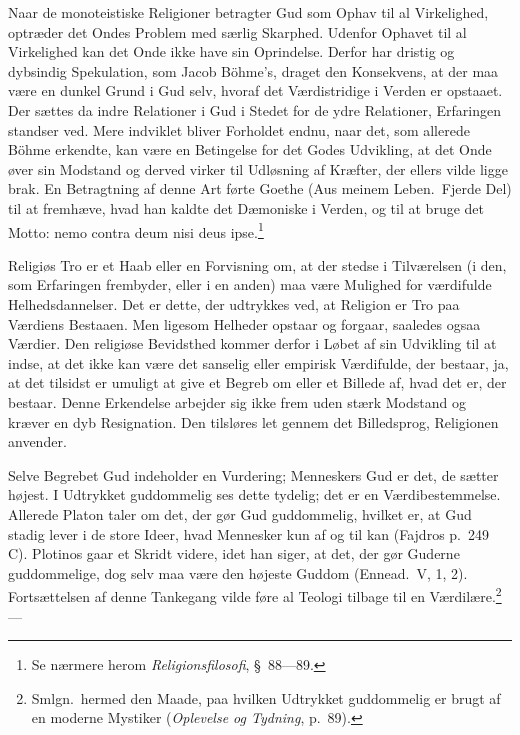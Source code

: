 \documentclass[12pt]{article}
\newcommand{\opage}[1]{\marginnote{\footnotesize\textit{[#1]}}}
\begin{document}
Naar de monoteistiske Religioner betragter Gud som Ophav til al
Virkelighed, optræder det Ondes Problem med særlig Skarphed. Udenfor
Ophavet til al Virkelighed kan det Onde ikke have sin Oprindelse.
Derfor har dristig og dybsindig Spekulation, som Jacob Böhme's, draget
den Konsekvens, at der maa være en dunkel Grund i Gud selv, hvoraf det
Værdistridige i Verden er opstaaet. Der sættes da indre Relationer i
Gud i Stedet for de ydre Relationer, Erfaringen standser ved. Mere
indviklet bliver Forholdet endnu, naar det, som allerede Böhme
erkendte, kan være en Betingelse for det Godes Udvikling, at det Onde
øver sin Modstand og derved virker til Udløsning af Kræfter, der
ellers vilde ligge brak. En Betragtning af denne Art
\opage{97} \setcounter{footnote}{0}
førte Goethe (Aus meinem Leben.\ Fjerde Del) til at fremhæve, hvad han
kaldte det Dæmoniske i Verden, og til at bruge det Motto: nemo contra
deum nisi deus ipse.\footnote{Se nærmere herom
\textit{Religionsfilosofi}, §~88---89.}

Religiøs Tro er et Haab eller en Forvisning om, at der stedse i
Tilværelsen (i den, som Erfaringen frembyder, eller i en anden) maa
være Mulighed for værdifulde Helhedsdannelser. Det er dette, der
udtrykkes ved, at Religion er Tro paa Værdiens Bestaaen. Men ligesom
Helheder opstaar og forgaar, saaledes ogsaa Værdier. Den religiøse
Bevidsthed kommer derfor i Løbet af sin Udvikling til at indse, at det
ikke kan være det sanselig eller empirisk Værdifulde, der bestaar, ja,
at det tilsidst er umuligt at give et Begreb om eller et Billede af,
hvad det er, der bestaar. Denne Erkendelse arbejder sig ikke frem uden
stærk Modstand og kræver en dyb Resignation. Den tilsløres let gennem
det Billedsprog, Religionen anvender.

Selve Begrebet Gud indeholder en Vurdering; Menneskers Gud er det, de
sætter højest. I Udtrykket \guillemotright
guddommelig\guillemotleft{} ses dette tydelig; det er en
Værdibestemmelse. Allerede Platon taler om \guillemotright det, der gør
Gud guddommelig\guillemotleft, hvilket er, at Gud stadig lever i de
store Ideer, hvad Mennesker kun af og til kan (Fajdros p.~249 C).
Plotinos gaar et Skridt videre, idet han siger, at det, der gør
Guderne guddommelige, dog selv maa være den højeste Guddom (Ennead.\ V,
1, 2). Fortsættelsen af denne Tankegang vilde føre al Teologi tilbage
til en Værdilære.\footnote{Smlgn.\ hermed den Maade, paa hvilken
Udtrykket \guillemotright guddommelig\guillemotleft{} er brugt af en
moderne Mystiker (\textit{Oplevelse og Tydning}, p.~89).} ---
\end{document}
